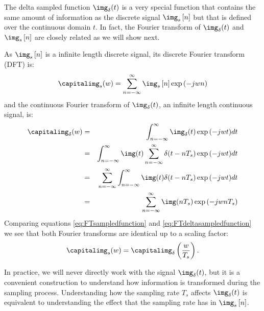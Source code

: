 The delta sampled function $\img_{\delta} (t)$ is a very special function that contains the same amount of information as the discrete signal $\img_s  \left[n \right]$ but that is defined over the continuous domain $t$. In fact, the Fourier transform of $\img_{\delta} (t)$ and $\img_s  \left[n \right]$ are closely related as we will show next.

As $\img_s  \left[n \right]$ is a infinite length discrete signal, its discrete Fourier transform (DFT) is:
\begin{equation}
    \capitalimg_s(w) = \sum_{n=-\infty}^{\infty} \img_s  \left[n \right] \exp{(-jwn)}
    \label{eq:FTsampledfunction}
\end{equation}
and the continuous Fourier transform of $\img_{\delta} (t)$, an infinite length continuous signal, is:
\begin{eqnarray}
    \capitalimg_{\delta} (w) &=& \int_{n=-\infty}^{\infty} \img_{\delta} (t) \exp{(-jwt)} dt \\
    & = & \int_{n=-\infty}^{\infty} \img(t) \sum_{n=-\infty}^{\infty} \delta(t-n T_s) \exp{(-jwt)} dt \\
    & = & \sum_{n=-\infty}^{\infty} \int_{n=-\infty}^{\infty} \img(t) \delta(t-n T_s) \exp{(-jwt)} dt \\
    & = & \sum_{n=-\infty}^{\infty} \img(n T_s) \exp{(-j w n T_s)}
    \label{eq:FTdeltasampledfunction}
\end{eqnarray}
Comparing equations \ref{eq:FTsampledfunction} and \ref{eq:FTdeltasampledfunction} we see that both Fourier transforms are identical up to a scaling factor:
\begin{equation}
    \capitalimg_s(w) = \capitalimg_{\delta} \left( \frac{w}{T_s} \right).
\end{equation}

In practice, we will never directly work with the signal $\img_{\delta} (t)$, but it is a convenient construction to understand how information is transformed during the sampling process. Understanding how the sampling rate $T_s$ affects $\img_{\delta} (t)$ is equivalent to  understanding the effect that the sampling rate has in $\img_s  \left[n \right]$.


